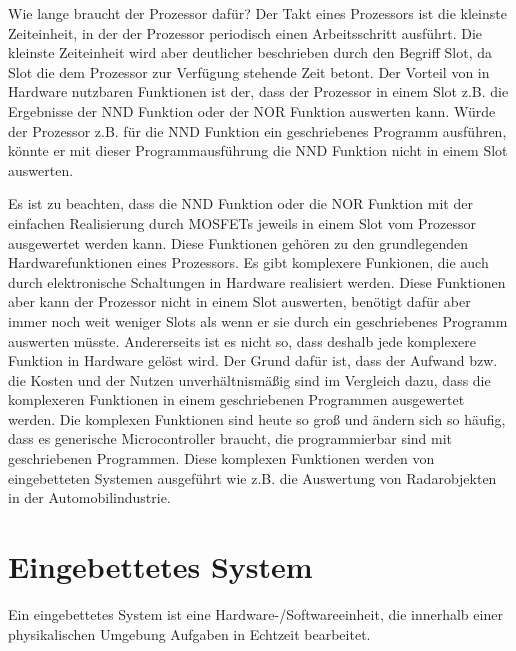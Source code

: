 \documentclass{scrarticle}
\numberwithin{equation}{section}
\begin{document}
Wie lange braucht der Prozessor dafür? Der Takt eines Prozessors ist die kleinste Zeiteinheit, in der der Prozessor periodisch einen Arbeitsschritt ausführt. Die kleinste Zeiteinheit wird aber deutlicher beschrieben durch den Begriff Slot, da Slot die dem Prozessor zur Verfügung stehende Zeit betont. Der Vorteil von in Hardware nutzbaren Funktionen ist der, dass der Prozessor in einem Slot z.B. die Ergebnisse der NND Funktion oder der NOR Funktion auswerten kann. Würde der Prozessor z.B. für die NND Funktion ein geschriebenes Programm ausführen, könnte er mit dieser Programmausführung die NND Funktion nicht in einem Slot auswerten.

Es ist zu beachten, dass die NND Funktion oder die NOR Funktion mit der einfachen Realisierung durch MOSFETs jeweils in einem Slot vom Prozessor ausgewertet werden kann. Diese Funktionen gehören zu den grundlegenden Hardwarefunktionen eines Prozessors. Es gibt komplexere Funkionen, die auch durch elektronische Schaltungen in Hardware realisiert werden. Diese Funktionen aber kann der Prozessor nicht in einem Slot auswerten, benötigt dafür aber immer noch weit weniger Slots als wenn er sie durch ein geschriebenes Programm auswerten müsste. Andererseits ist es nicht so, dass deshalb jede komplexere Funktion in Hardware gelöst wird. Der Grund dafür ist, dass der Aufwand bzw. die Kosten und der Nutzen unverhältnismäßig sind im Vergleich dazu, dass die komplexeren Funktionen in einem geschriebenen Programmen ausgewertet werden. Die komplexen Funktionen sind heute so groß und ändern sich so häufig, dass es generische Microcontroller braucht, die programmierbar sind mit geschriebenen Programmen. Diese komplexen Funktionen werden von eingebetteten Systemen ausgeführt wie z.B. die Auswertung von Radarobjekten in der Automobilindustrie.

\section{Eingebettetes System}
Ein eingebettetes System ist eine Hardware-/Softwareeinheit, die innerhalb einer physikalischen Umgebung Aufgaben in Echtzeit bearbeitet.
  
\end{document}
